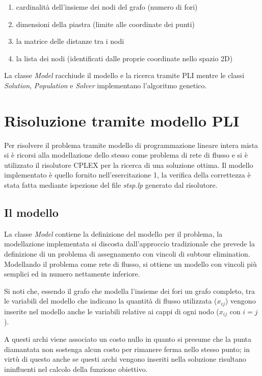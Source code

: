 \documentclass[a4paper]{article}
\begin{document}
        \begin{enumerate}
            \item cardinalit\`a dell'insieme dei nodi del grafo (numero di fori)
            \item dimensioni della piastra (limite alle coordinate dei punti)
            \item la matrice delle distanze tra i nodi
            \item la lista dei nodi (identificati dalle proprie coordinate nello spazio 2D)
        \end{enumerate}

        La classe \emph{Model} racchiude il modello e la ricerca tramite PLI mentre le classi \emph{Solution}, \emph{Population} e \emph{Solver}
        implementano l'algoritmo genetico.

    \section{Risoluzione tramite modello PLI}
        Per risolvere il problema tramite modello di programmazione lineare intera mista si \`e ricorsi alla modellazione dello stesso come problema di
        rete di flusso e si \`e utilizzato il risolutore CPLEX per la ricerca di una soluzione ottima.
        Il modello implementato \`e quello fornito nell'esercitazione 1, la verifica della correttezza \`e stata fatta mediante ispezione del file
        \emph{stsp.lp} generato dal risolutore.

        \subsection{Il modello}
        
        La classe \emph{Model} contiene la definizione del modello per il problema, la modellazione implementata si discosta dall'approccio tradizionale che prevede la definizione di
        un problema di assegnamento con vincoli di subtour elimination.
        Modellando il problema come rete di flusso, si ottiene un modello con vincoli pi\`u semplici ed in numero nettamente inferiore.

        Si noti che, essendo il grafo che modella l'insieme dei fori un grafo completo, tra le variabili del modello che indicano la quantit\`a di flusso utilizzata ($x_{ij}$)
        vengono inserite nel modello anche le variabili relative ai cappi di ogni nodo ($x_{ij}$ con $i = j$).

        A questi archi viene associato un costo nullo in quanto si presume che la punta diamantata non sostenga alcun costo per rimanere ferma nello stesso punto; in virt\`u di questo
        anche se questi archi vengono inseriti nella soluzione risultano ininfluenti nel calcolo della funzione obiettivo.
        
\end{document}
